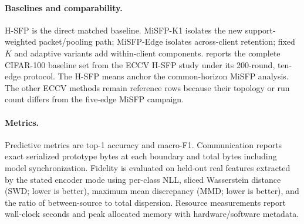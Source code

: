 \paragraph{Baselines and comparability.}
H-SFP is the direct matched baseline. MiSFP-K1 isolates the new support-weighted packet/pooling path; MiSFP-Edge isolates across-client retention; fixed $K$ and adaptive variants add within-client components.  reports the complete CIFAR-100 baseline set from the ECCV H-SFP study under its 200-round, ten-edge protocol. The H-SFP means anchor the common-horizon MiSFP analysis. The other ECCV methods remain reference rows because their topology or run count differs from the five-edge MiSFP campaign.

\paragraph{Metrics.}
Predictive metrics are top-1 accuracy and macro-F1. Communication reports exact serialized prototype bytes at each boundary and total bytes including model synchronization. Fidelity is evaluated on held-out real features extracted by the stated encoder mode using per-class NLL, sliced Wasserstein distance (SWD; lower is better), maximum mean discrepancy (MMD; lower is better), and the ratio of between-source to total dispersion. Resource measurements report wall-clock seconds and peak allocated memory with hardware/software metadata.

